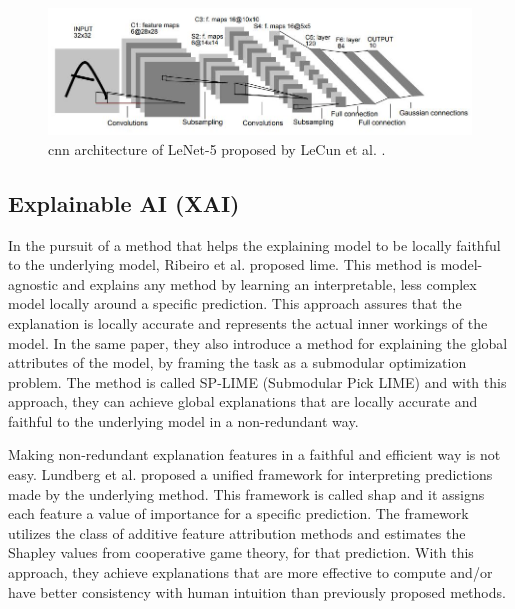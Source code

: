 \begin{figure}[htb]
    \centerline{
    \includegraphics[width=1.2\linewidth]{images/LeNet.jpg}}
    \caption{\gls{cnn} architecture of LeNet-5 proposed by LeCun et al. \cite{lecunGradientbasedLearningApplied1998}.}
    \label{fig:lenet}
\end{figure} 

\subsection{Explainable AI (XAI)}


In the pursuit of a method that helps the explaining model to be locally faithful to the underlying model, Ribeiro et al. \cite{ribeiroWhyShouldTrust2016} proposed \gls{lime}. This method is model-agnostic and explains any method by learning an interpretable, less complex model locally around a specific prediction. This approach assures that the explanation is locally accurate and represents the actual inner workings of the model. 
In the same paper, they also introduce a method for explaining the global attributes of the model, by framing the task as a submodular optimization problem. The method is called SP-LIME (Submodular Pick LIME) and with this approach, they can achieve global explanations that are locally accurate and faithful to the underlying model in a non-redundant way.

Making non-redundant explanation features in a faithful and efficient way is not easy. Lundberg et al. \cite{lundbergUnifiedApproachInterpreting2017} proposed a unified framework for interpreting predictions made by the underlying method. This framework is called \gls{shap} and it assigns each feature a value of importance for a specific prediction. The framework utilizes the class of additive feature attribution methods and estimates the Shapley %
values from cooperative game theory, for that prediction. With this approach, they achieve explanations that are more effective to compute and/or have better consistency with human intuition than previously proposed methods.  


